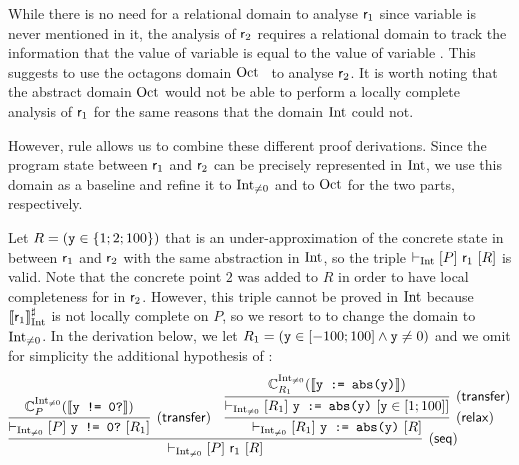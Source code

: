 \begin{example}
	While there is no need for a relational domain to analyse $\mathsf{r}_1$ since  variable  is never mentioned in it,
	the analysis of $\mathsf{r}_2$ requires a relational domain to track the information that the value of variable  is equal to the value of variable .
	This suggests to use the octagons domain $\text{Oct}$~\cite{Mine06} to analyse $\mathsf{r}_2$. It is worth noting that the abstract domain $\text{Oct}$ would not be able to perform a locally complete analysis of $\mathsf{r}_1$ for the same reasons that the domain $\text{Int}$ could not.

	However, rule  allows us to combine these different proof derivations. Since the program state between $\mathsf{r}_1$ and $\mathsf{r}_2$ can be precisely represented in $\text{Int}$, we use this domain as a baseline and refine it to $\text{Int}_{\neq 0}$ and to $\text{Oct}$ for the two parts, respectively.


	Let $R = (\texttt{y} \in \{ 1; 2; 100 \})$ that is an under\hyp{}approximation of the concrete state in between $\mathsf{r}_1$ and $\mathsf{r}_2$ with the same abstraction in $\text{Int}$, so the triple $\vdash_{\text{Int}}\nobreak[P]~\mathsf{r}_1~[R]$ is valid. Note that the concrete point $2$ was added to $R$ in order to have local completeness for  in $\mathsf{r}_2$. However, this triple cannot be proved in $\text{Int}$ because $\llbracket\mathsf{r}_1\rrbracket^{\sharp}_{\text{Int}}$ is not locally complete on $P$, so we resort to  to change the domain to $\text{Int}_{\neq 0}$.
	In the derivation below, we let $R_1 = (\texttt{y} \in [-100; 100] \land \texttt{y} \neq 0)$ and we omit for simplicity the additional hypothesis of :
	\[
	\infer[(\mathsf{seq})]
	{\lcl{\Int_{\neq 0}}{P}{\regr_1}{R}
	}
	{
		\infer[(\mathsf{transfer})]
		{\lcl{\Int_{\neq 0}}{P}{\code{y != 0?}}{R_1}}{ \complete{\Int_{\neq 0}}{P}{\denot{\code{y != 0?}}} }
		&
		\infer[(\mathsf{relax})]
		{\lcl{\Int_{\neq 0}}{R_1}{\code{y := abs(y)}}{R}}
		{\infer[(\mathsf{transfer})]
			{\lcl{\Int_{\neq 0}}{R_1}{\code{y := abs(y)}}{\code{y} \in [1; 100]}}{ \complete{\Int_{\neq 0}}{R_1}{\denot{\code{y := abs(y)}}} }
		}
	}
	\]


\end{example}
